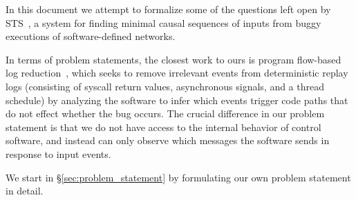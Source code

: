 In this document we attempt to formalize some of the questions left open by
STS~\cite{sts}, a system for finding minimal causal sequences of inputs from
buggy executions of software-defined networks.

In terms of problem statements, the closest work to ours is program flow-based
log reduction~\cite{zhang2006dynamic,tallam2007enabling,Lee:2011:TGR:1993498.1993528,huang2012lean},
which seeks to remove irrelevant events from deterministic replay logs
(consisting of syscall return values, asynchronous signals, and a thread
schedule) by analyzing the
software to infer which events trigger code paths that do not effect whether
the bug occurs. The crucial difference in our problem statement is that
we do not have access to the internal behavior of control software, and
instead can only observe which messages the software sends in response to input events.

We start in \S\ref{sec:problem_statement} by formulating our own problem
statement in detail.
